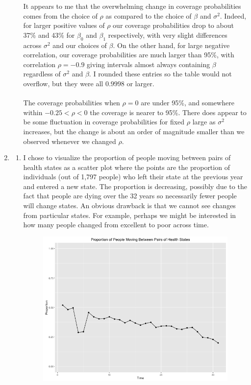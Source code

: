 \documentclass[11pt]{article}
\begin{document}
\begin{enumerate}
\begin{enumerate}
			It appears to me that the overwhelming change in coverage probabilities comes from the choice of $\rho$ as compared to the choice of $\beta$ and $\sigma^2$. Indeed, for larger positive values of $\rho$ our coverage probabilities drop to about 37\% and 43\% for $\beta_0$ and $\beta_1$ respectively, with very slight differences across $\sigma^2$ and our choices of $\beta$. On the other hand, for large negative correlation, our coverage probabilities are much larger than 95\%, with correlation $\rho=-0.9$ giving intervals almost always containing $\beta$ regardless of $\sigma^2$ and $\beta$. I rounded these entries so the table would not overflow, but they were all $0.9998$ or larger.
			\\ \\The coverage probabilities when $\rho=0$ are under 95\%, and somewhere within $-0.25 < \rho < 0$ the coverage is nearer to 95\%. There does appear to be some fluctuation in coverage probabilities for fixed $\rho$ large as $\sigma^2$ increases, but the change is about an order of magnitude smaller than we observed whenever we changed $\rho$.
		\end{enumerate}
	\item
		\begin{enumerate}
			\item I chose to visualize the proportion of people moving between pairs of health states as a scatter plot where the points are the proportion of individuals (out of 1,797 people) who left their state at the previous year and entered a new state. The proportion is decreasing, possibly due to the fact that people are dying over the 32 years so necessarily fewer people will change states. An obvious drawback is that we cannot see changes from particular states. For example, perhaps we might be interested in how many people changed from excellent to poor across time.
			\begin{figure}[H]
				\centering
				\includegraphics[scale=0.5]{Rplotp4p1}

\end{figure}
\end{enumerate}
\end{enumerate}
\end{document}
